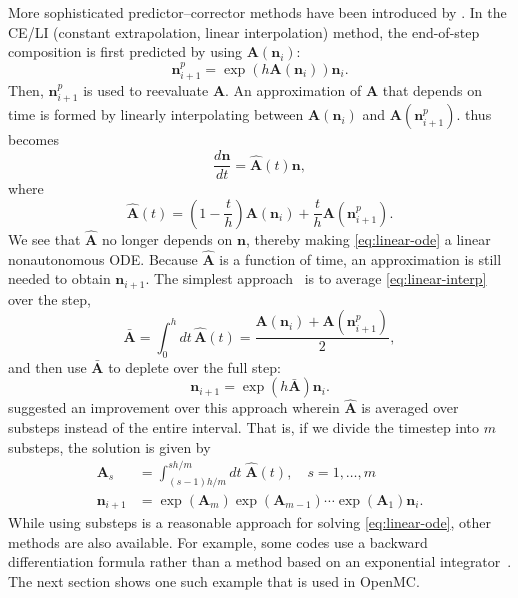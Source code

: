 \documentclass[3p,authoryear]{elsarticle}
\newcommand{\vect}[1]{\mathbf{#1}} %
\begin{document}
More sophisticated predictor--corrector methods have been introduced by
\citet{isotalo2011ane2,isotalo2011ane3}. In the CE/LI (constant extrapolation,
linear interpolation) method, the end-of-step composition is first predicted
by using $\vect{A}(\vect{n}_i)$:
\begin{equation}
  \vect{n}_{i+1}^p = \exp \left( h\vect{A}(\vect{n}_i) \right) \vect{n}_i.
\end{equation}
Then, $\vect{n}_{i+1}^p$ is used to reevaluate $\vect{A}$. An approximation of
$\vect{A}$ that depends on time is formed by linearly interpolating between
$\vect{A}(\vect{n}_i)$ and $\vect{A}\left(\vect{n}_{i+1}^p\right)$.
 thus becomes
\begin{equation}
  \label{eq:linear-ode}
  \frac{d\vect{n}}{dt} = \hat{\vect{A}}(t) \vect{n},
\end{equation}
where
\begin{equation}
  \label{eq:linear-interp}
  \hat{\vect{A}}(t) = \left ( 1 - \frac{t}{h} \right) \vect{A}(\vect{n}_i) +
  \frac{t}{h} \vect{A}\left(\vect{n}_{i+1}^p \right).
\end{equation}
We see that $\hat{\vect{A}}$ no longer depends on $\vect{n}$, thereby making
\cref{eq:linear-ode} a linear nonautonomous ODE. Because $\hat{\vect{A}}$ is a
function of time, an approximation is still needed to obtain $\vect{n}_{i+1}$.
The simplest approach~\citep{isotalo2011ane2} is to average
\cref{eq:linear-interp} over the step,
\begin{equation}
  \bar{\vect{A}} = \int_0^h dt \, \hat{\vect{A}}(t) = \frac{\vect{A}(\vect{n}_i)
  + \vect{A}(\vect{n}_{i+1}^p)}{2},
\end{equation}
and then use $\bar{\vect{A}}$ to deplete over the full step:
\begin{equation}
  \vect{n}_{i+1} = \exp \left ( h \bar{\vect{A}} \right ) \vect{n}_i.
\end{equation}
\citet{isotalo2011ane3} suggested an improvement over this approach wherein
$\hat{\vect{A}}$ is averaged over substeps instead of the entire interval. That
is, if we divide the timestep into $m$ substeps, the solution is given by
\begin{equation}
  \begin{split}
    \label{eq:celi-substeps}
    \vect{A}_s &= \int_{(s-1)h/m}^{sh/m} dt \; \hat{\vect{A}}(t), \quad s=1,\dots,m \\
    \vect{n}_{i+1} &= \exp\left(\vect{A}_m \right) \exp \left(\vect{A}_{m-1}\right)
    \cdots \exp\left(\vect{A}_1\right) \vect{n}_i.
  \end{split}
\end{equation}
While using substeps is a reasonable approach for solving \cref{eq:linear-ode},
other methods are also available. For example, some codes use a backward
differentiation formula rather than a method based on an exponential
integrator~\citep{carpenter2009mc,hykes2017mc,sublet2017nds}. The next section
shows one such example that is used in OpenMC.
\end{document}
